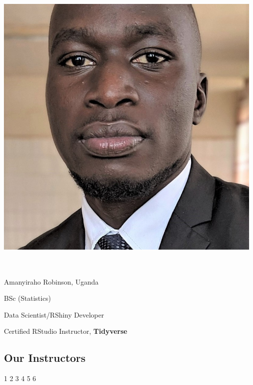 \documentclass[
  letterpaper,
  DIV=11,
  numbers=noendperiod]{scrartcl}
\begin{document}
\includegraphics[width=5.19792in,height=5.97917in]{images/robinson.jpg}

Amanyiraho Robinson, Uganda

BSc (Statistics)

Data Scientist/RShiny Developer

Certified RStudio Instructor, {\textbf{Tidyverse}}

\hypertarget{our-instructors-2}{%
\subsection{Our Instructors}\label{our-instructors-2}}

{1} 2 {3 4 5 6}
\end{document}
